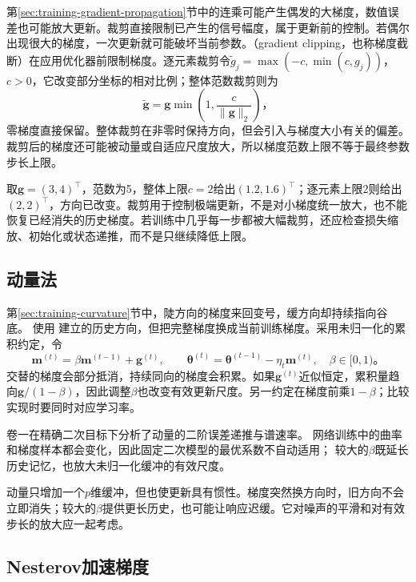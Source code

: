 第\ref{sec:training-gradient-propagation}节中的连乘可能产生偶发的大梯度，数值误差也可能放大更新。裁剪直接限制已产生的信号幅度，属于更新前的控制。若偶尔出现很大的梯度，一次更新就可能破坏当前参数。（gradient clipping，也称梯度截断）在应用优化器前限制梯度。逐元素裁剪令$\tilde g_j=\max(-c,\min(c,g_j))$，$c>0$，它改变部分坐标的相对比例；整体范数裁剪则为
\begin{equation}
  \tilde{\bm g}=\bm g\min\left(1,\frac{c}{\lVert\bm g\rVert_2}\right)\text{，}
  \label{eq:training-norm-clipping}
\end{equation}
零梯度直接保留。整体裁剪在非零时保持方向，但会引入与梯度大小有关的偏差。裁剪后的梯度还可能被动量或自适应尺度放大，所以梯度范数上限不等于最终参数步长上限。

取$\bm g=(3,4)^{\top}$，范数为5，整体上限$c=2$给出$(1.2,1.6)^{\top}$；逐元素上限2则给出$(2,2)^{\top}$，方向已改变。裁剪用于控制极端更新，不是对小梯度统一放大，也不能恢复已经消失的历史梯度。若训练中几乎每一步都被大幅裁剪，还应检查损失缩放、初始化或状态递推，而不是只继续降低上限。

\subsection{动量法}
\label{sec:training-momentum}

第\ref{sec:training-curvature}节中，陡方向的梯度来回变号，缓方向却持续指向谷底。
使用
建立的历史方向，但把完整梯度换成当前训练梯度。采用未归一化的累积约定，令
\begin{equation}
  \bm m^{(t)}=\beta\bm m^{(t-1)}+\bm g^{(t)},\qquad
  \bm\theta^{(t)}=\bm\theta^{(t-1)}-\eta_t\bm m^{(t)},
  \quad\beta\in[0,1)\text{。}
  \label{eq:training-momentum}
\end{equation}
交替的梯度会部分抵消，持续同向的梯度会积累。如果$\bm g^{(t)}$近似恒定，累积量趋向$\bm g/(1-\beta)$，因此调整$\beta$也改变有效更新尺度。另一约定在梯度前乘$1-\beta$；比较实现时要同时对应学习率。

卷一在精确二次目标下分析了动量的二阶误差递推与谱速率。
网络训练中的曲率和梯度样本都会变化，因此固定二次模型的最优系数不自动适用；
较大的$\beta$既延长历史记忆，也放大未归一化缓冲的有效尺度。

动量只增加一个$p$维缓冲，但也使更新具有惯性。梯度突然换方向时，旧方向不会立即消失；较大的$\beta$提供更长历史，也可能让响应迟缓。它对噪声的平滑和对有效步长的放大应一起考虑。

\subsection{Nesterov加速梯度}
\label{sec:training-nesterov}

